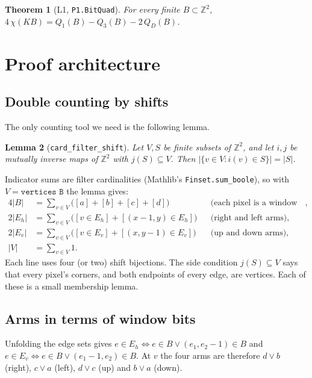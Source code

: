 \documentclass[11pt]{article}
\newtheorem{theorem}{Theorem}
\newtheorem{lemma}[theorem]{Lemma}
\theoremstyle{definition}
\theoremstyle{remark}
\begin{document}
\begin{theorem}[L1, \texttt{P1.BitQuad}]\label{thm:main}
For every finite $B\subset\mathbb{Z}^2$,
$4\,\chi(K B) = Q_1(B) - Q_3(B) - 2\,Q_D(B)$.
\end{theorem}

\section{Proof architecture}

\subsection{Double counting by shifts}
The only counting tool we need is the following lemma.

\begin{lemma}[\texttt{card\_filter\_shift}]
Let $V,S$ be finite subsets of $\mathbb{Z}^2$, and let $i,j$ be mutually inverse
maps of $\mathbb{Z}^2$ with $j(S)\subseteq V$. Then
$|\{v\in V : i(v)\in S\}| = |S|$.
\end{lemma}
Indicator sums are filter cardinalities (Mathlib's \texttt{Finset.sum\_boole}),
so with $V=\texttt{vertices B}$ the lemma gives:
\begin{align*}
  4|B| &= \sum_{v\in V} \big([a]+[b]+[c]+[d]\big)
  && \text{(each pixel is a window entry at each of its 4 corners)},\\
  2|E_h| &= \sum_{v\in V} \big([v\in E_h] + [(x{-}1,y)\in E_h]\big)
  && \text{(right and left arms)},\\
  2|E_v| &= \sum_{v\in V} \big([v\in E_v] + [(x,y{-}1)\in E_v]\big)
  && \text{(up and down arms)},\\
  |V| &= \sum_{v\in V} 1.
\end{align*}
Each line uses four (or two) shift bijections. The side condition
$j(S)\subseteq V$ says that every pixel's corners, and both endpoints of every
edge, are vertices. Each of these is a small membership lemma.

\subsection{Arms in terms of window bits}
Unfolding the edge sets gives $e\in E_h \iff e\in B \lor (e_1,e_2-1)\in B$ and
$e\in E_v \iff e\in B \lor (e_1-1,e_2)\in B$. At $v$ the four arms are therefore
$d\lor b$ (right), $c\lor a$ (left), $d\lor c$ (up) and $b\lor a$ (down).
\end{document}
